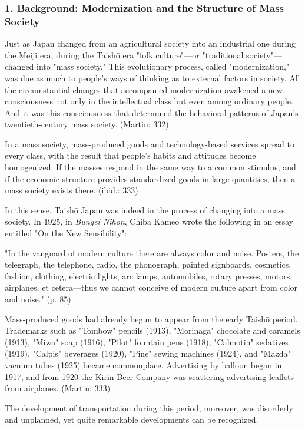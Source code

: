 \subsubsection{1. Background: Modernization and the Structure of Mass Society}

Just as Japan changed from an agricultural society into an industrial one during the Meiji era, during the Taishō era "folk culture"—or "traditional society"—changed into "mass society." This evolutionary process, called "modernization," was due as much to people's ways of thinking as to external factors in society. All the circumstantial changes that accompanied modernization awakened a new consciousness not only in the intellectual class but even among ordinary people. And it was this consciousness that determined the behavioral patterns of Japan's twentieth-century mass society. (Martin: 332)

In a mass society, mass-produced goods and technology-based services spread to every class, with the result that people's habits and attitudes become homogenized. If the masses respond in the same way to a common stimulus, and if the economic structure provides standardized goods in large quantities, then a mass society exists there. (ibid.: 333)

In this sense, Taishō Japan was indeed in the process of changing into a mass society. In 1925, in \textit{Bungei Nihon}, Chiba Kameo wrote the following in an essay entitled "On the New Sensibility":

\begin{gquote}
"In the vanguard of modern culture there are always color and noise. Posters, the telegraph, the telephone, radio, the phonograph, painted signboards, cosmetics, fashion, clothing, electric lights, arc lamps, automobiles, rotary presses, motors, airplanes, et cetera—thus we cannot conceive of modern culture apart from color and noise." (p. 85)
\end{gquote}

Mass-produced goods had already begun to appear from the early Taishō period. Trademarks such as "Tombow" pencils (1913), "Morinaga" chocolate and caramels (1913), "Miwa" soap (1916), "Pilot" fountain pens (1918), "Calmotin" sedatives (1919), "Calpis" beverages (1920), "Pine" sewing machines (1924), and "Mazda" vacuum tubes (1925) became commonplace. Advertising by balloon began in 1917, and from 1920 the Kirin Beer Company was scattering advertising leaflets from airplanes. (Martin: 333)

The development of transportation during this period, moreover, was disorderly and unplanned, yet quite remarkable developments can be recognized.

